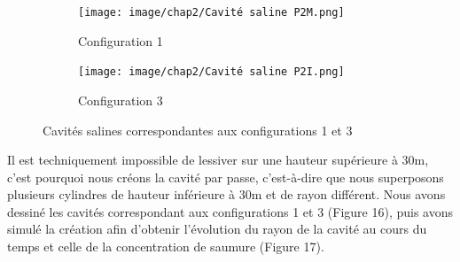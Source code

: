 \documentclass[11pt,french,a4paper]{article}
\begin{document}
\begin{figure}[!h]
  \centering
  \begin{subfigure}[b]{0.20\linewidth}
    \texttt{[image: image/chap2/Cavité saline P2M.png]}
    \caption{Configuration 1}
  \end{subfigure}
  \begin{subfigure}[b]{0.20\linewidth}
    \texttt{[image: image/chap2/Cavité saline P2I.png]}
    \caption{Configuration 3 }
  \end{subfigure}
  \caption{Cavités salines correspondantes aux configurations 1 et 3}
\end{figure}


Il est techniquement impossible de lessiver sur une hauteur supérieure à 30m, c’est pourquoi nous créons la cavité par passe, c’est-à-dire que nous superposons plusieurs cylindres de hauteur inférieure à 30m et de rayon différent.
Nous avons dessiné les cavités correspondant aux configurations 1 et 3 (Figure 16), puis avons simulé la création afin d'obtenir l’évolution du rayon de la cavité au cours du temps et celle de la concentration de saumure (Figure 17).
\end{document}
